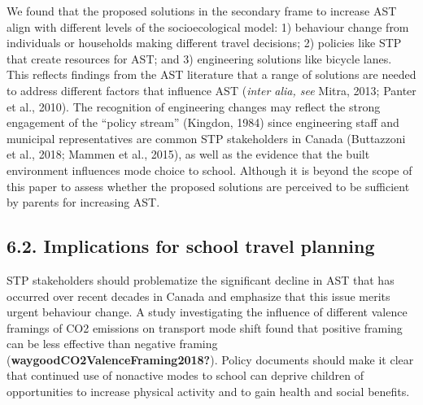 \documentclass[]{elsarticle} %
\begin{document}
We found that the proposed solutions in the secondary frame to increase
AST align with different levels of the socioecological model: 1)
behaviour change from individuals or households making different travel
decisions; 2) policies like STP that create resources for AST; and 3)
engineering solutions like bicycle lanes. This reflects findings from
the AST literature that a range of solutions are needed to address
different factors that influence AST (\emph{inter alia, see} Mitra,
2013; Panter et al., 2010). The recognition of engineering changes may
reflect the strong engagement of the ``policy stream'' (Kingdon, 1984)
since engineering staff and municipal representatives are common STP
stakeholders in Canada (Buttazzoni et al., 2018; Mammen et al., 2015),
as well as the evidence that the built environment influences mode
choice to school. Although it is beyond the scope of this paper to
assess whether the proposed solutions are perceived to be sufficient by
parents for increasing AST.

\hypertarget{implications-for-school-travel-planning}{%
\subsection{6.2. Implications for school travel
planning}\label{implications-for-school-travel-planning}}

STP stakeholders should problematize the significant decline in AST that
has occurred over recent decades in Canada and emphasize that this issue
merits urgent behaviour change. A study investigating the influence of
different valence framings of CO2 emissions on transport mode shift
found that positive framing can be less effective than negative framing
(\textbf{waygoodCO2ValenceFraming2018?}). Policy documents should make
it clear that continued use of nonactive modes to school can deprive
children of opportunities to increase physical activity and to gain
health and social benefits.
\end{document}
